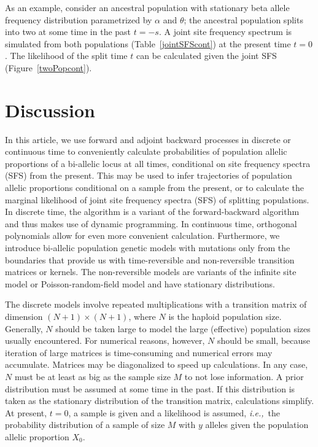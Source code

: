 \documentclass[preprint]{elsarticle}
\newcommand\ie{{\it i.e.,}}
\newcommand\x[1]{\ensuremath{X_{#1}}}
\begin{document}
As an example, consider an ancestral population with stationary beta allele frequency distribution parametrized by $\alpha$ and $\theta$; the ancestral population splits into two at some time in the past $t=-s$. A joint site frequency spectrum is simulated from both populations (Table~\ref{jointSFScont}) at the present time $t=0$. The likelihood of the split time $t$ can be calculated given the joint SFS (Figure~\ref{twoPopcont}). 

\section{Discussion}

In this article, we use forward and adjoint backward processes in discrete or continuous time to conveniently calculate probabilities of population allelic proportions of a bi-allelic locus at all times, conditional on site frequency spectra (SFS) from the present. This may be used to infer trajectories of population allelic proportions conditional on a sample from the present, or to calculate the marginal likelihood of joint site frequency spectra (SFS) of splitting populations. In discrete time, the algorithm is a variant of the forward-backward algorithm and thus makes use of dynamic programming. In continuous time, orthogonal polynomials allow for even more convenient calculation. Furthermore, we introduce bi-allelic population genetic models with mutations only from the boundaries that provide us with time-reversible and non-reversible transition matrices or kernels. The non-reversible models are variants of the infinite site model \citep{Kimu69} or Poisson-random-field model \citep{Sawy92} and have stationary distributions.

The discrete models involve repeated multiplications with a transition matrix of dimension $(N+1)\times(N+1)$, where $N$ is the haploid population size. Generally, $N$ should be taken large to model the large (effective) population sizes usually encountered. For numerical reasons, however, $N$ should be small, because iteration of large matrices is time-consuming and numerical errors may accumulate. Matrices may be diagonalized to speed up calculations. In any case, $N$ must be at least as big as the sample size $M$ to not lose information. A prior distribution must be assumed at some time in the past. If this distribution is taken as the stationary distribution of the transition matrix, calculations simplify. At present, $t=0$, a sample is given and a likelihood is assumed, \ie\ the probability distribution of a sample of size $M$ with $y$ alleles given the population allelic proportion $\x{0}$.
\end{document}
